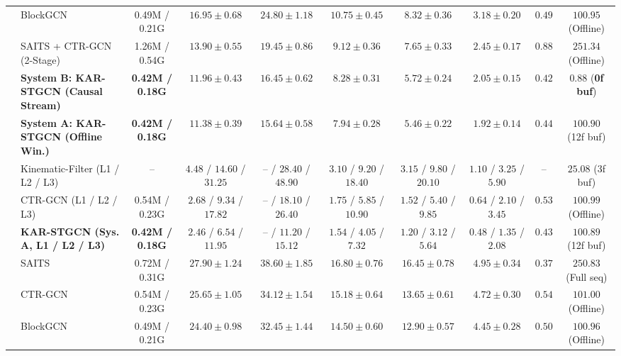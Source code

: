 \documentclass[10pt,twocolumn]{article}
\begin{document}
\begin{table}[!t]
{\begin{tabular}{llcccccccc}
 & BlockGCN \cite{zhou2024blockgcn} & 0.49M / 0.21G & $16.95 \pm 0.68$ & $24.80 \pm 1.18$ & $10.75 \pm 0.45$ & $8.32 \pm 0.36$ & $3.18 \pm 0.20$ & $0.49$ & $100.95$ (Offline) \\
 & SAITS + CTR-GCN (2-Stage) & 1.26M / 0.54G & $13.90 \pm 0.55$ & $19.45 \pm 0.86$ & $9.12 \pm 0.36$ & $7.65 \pm 0.33$ & $2.45 \pm 0.17$ & $0.88$ & $251.34$ (Offline) \\
 & \textbf{System B: KAR-STGCN (Causal Stream)} & \textbf{0.42M / 0.18G} & $11.96 \pm 0.43$ & $16.45 \pm 0.62$ & $8.28 \pm 0.31$ & $5.72 \pm 0.24$ & $2.05 \pm 0.15$ & $0.42$ & $\mathbf{0.88}$ (\textbf{0f buf}) \\
 & \textbf{System A: KAR-STGCN (Offline Win.)} & \textbf{0.42M / 0.18G} & $\mathbf{11.38 \pm 0.39}$ & $\mathbf{15.64 \pm 0.58}$ & $\mathbf{7.94 \pm 0.28}$ & $\mathbf{5.46 \pm 0.22}$ & $\mathbf{1.92 \pm 0.14}$ & $0.44$ & $100.90$ (12f buf) \\
\midrule
{} 
 & Kinematic-Filter (L1 / L2 / L3) & -- & $4.48$ / $14.60$ / $31.25$ & -- / $28.40$ / $48.90$ & $3.10$ / $9.20$ / $18.40$ & $3.15$ / $9.80$ / $20.10$ & $1.10$ / $3.25$ / $5.90$ & -- & $25.08$ (3f buf) \\
 & CTR-GCN \cite{chen2021ctrgcn} (L1 / L2 / L3) & 0.54M / 0.23G & $2.68$ / $9.34$ / $17.82$ & -- / $18.10$ / $26.40$ & $1.75$ / $5.85$ / $10.90$ & $1.52$ / $5.40$ / $9.85$ & $0.64$ / $2.10$ / $3.45$ & $0.53$ & $100.99$ (Offline) \\
 & \textbf{KAR-STGCN (Sys. A, L1 / L2 / L3)} & \textbf{0.42M / 0.18G} & $\mathbf{2.46}$ / $\mathbf{6.54}$ / $\mathbf{11.95}$ & -- / $\mathbf{11.20}$ / $\mathbf{15.12}$ & $\mathbf{1.54}$ / $\mathbf{4.05}$ / $\mathbf{7.32}$ & $\mathbf{1.20}$ / $\mathbf{3.12}$ / $\mathbf{5.64}$ & $\mathbf{0.48}$ / $\mathbf{1.35}$ / $\mathbf{2.08}$ & $0.43$ & $100.89$ (12f buf) \\
\midrule
{} 
 & SAITS \cite{du2023saits} & 0.72M / 0.31G & $27.90 \pm 1.24$ & $38.60 \pm 1.85$ & $16.80 \pm 0.76$ & $16.45 \pm 0.78$ & $4.95 \pm 0.34$ & $\mathbf{0.37}$ & $250.83$ (Full seq) \\
 & CTR-GCN \cite{chen2021ctrgcn} & 0.54M / 0.23G & $25.65 \pm 1.05$ & $34.12 \pm 1.54$ & $15.18 \pm 0.64$ & $13.65 \pm 0.61$ & $4.72 \pm 0.30$ & $0.54$ & $101.00$ (Offline) \\
 & BlockGCN \cite{zhou2024blockgcn} & 0.49M / 0.21G & $24.40 \pm 0.98$ & $32.45 \pm 1.44$ & $14.50 \pm 0.60$ & $12.90 \pm 0.57$ & $4.45 \pm 0.28$ & $0.50$ & $100.96$ (Offline) \\

\end{tabular}}
\end{table}
\end{document}
